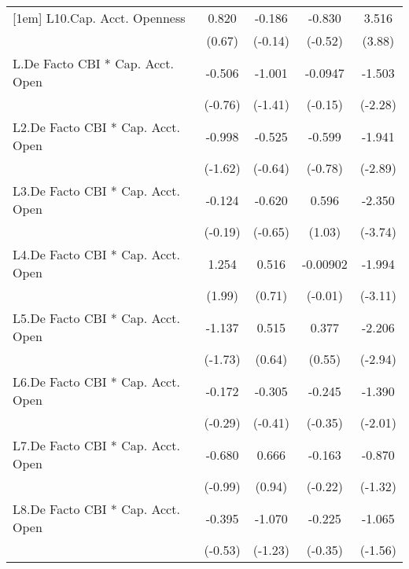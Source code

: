 {\begin{longtable}{l*{4}{c}}
[1em]
L10.Cap. Acct. Openness&    0.820         &   -0.186         &   -0.830         &    3.516\sym{***}\\
                &   (0.67)         &  (-0.14)         &  (-0.52)         &   (3.88)         \\
[1em]
L.De Facto CBI * Cap. Acct. Open&   -0.506         &   -1.001         &  -0.0947         &   -1.503\sym{*}  \\
                &  (-0.76)         &  (-1.41)         &  (-0.15)         &  (-2.28)         \\
[1em]
L2.De Facto CBI * Cap. Acct. Open&   -0.998         &   -0.525         &   -0.599         &   -1.941\sym{**} \\
                &  (-1.62)         &  (-0.64)         &  (-0.78)         &  (-2.89)         \\
[1em]
L3.De Facto CBI * Cap. Acct. Open&   -0.124         &   -0.620         &    0.596         &   -2.350\sym{***}\\
                &  (-0.19)         &  (-0.65)         &   (1.03)         &  (-3.74)         \\
[1em]
L4.De Facto CBI * Cap. Acct. Open&    1.254\sym{*}  &    0.516         & -0.00902         &   -1.994\sym{**} \\
                &   (1.99)         &   (0.71)         &  (-0.01)         &  (-3.11)         \\
[1em]
L5.De Facto CBI * Cap. Acct. Open&   -1.137         &    0.515         &    0.377         &   -2.206\sym{**} \\
                &  (-1.73)         &   (0.64)         &   (0.55)         &  (-2.94)         \\
[1em]
L6.De Facto CBI * Cap. Acct. Open&   -0.172         &   -0.305         &   -0.245         &   -1.390\sym{*}  \\
                &  (-0.29)         &  (-0.41)         &  (-0.35)         &  (-2.01)         \\
[1em]
L7.De Facto CBI * Cap. Acct. Open&   -0.680         &    0.666         &   -0.163         &   -0.870         \\
                &  (-0.99)         &   (0.94)         &  (-0.22)         &  (-1.32)         \\
[1em]
L8.De Facto CBI * Cap. Acct. Open&   -0.395         &   -1.070         &   -0.225         &   -1.065         \\
                &  (-0.53)         &  (-1.23)         &  (-0.35)         &  (-1.56)         \\

\end{longtable}}
